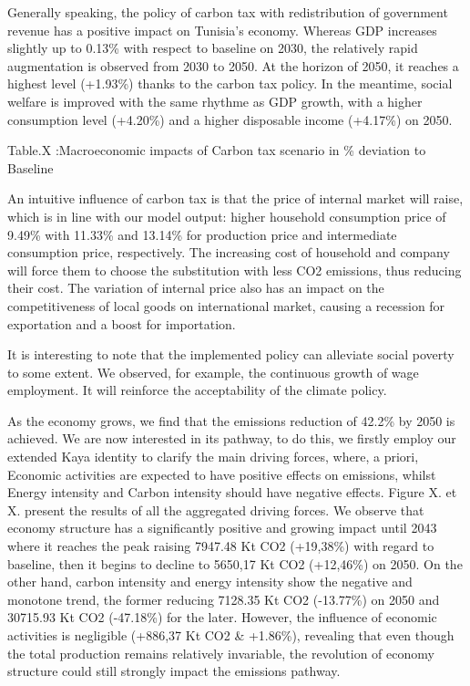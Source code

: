 \documentclass[
]{article}
\begin{document}
Generally speaking, the policy of carbon tax with redistribution of
government revenue has a positive impact on Tunisia's economy. Whereas
GDP increases slightly up to 0.13\% with respect to baseline on 2030,
the relatively rapid augmentation is observed from 2030 to 2050. At the
horizon of 2050, it reaches a highest level (+1.93\%) thanks to the
carbon tax policy. In the meantime, social welfare is improved with the
same rhythme as GDP growth, with a higher consumption level (+4.20\%)
and a higher disposable income (+4.17\%) on 2050.

Table.X :Macroeconomic impacts of Carbon tax scenario in \% deviation to
Baseline

An intuitive influence of carbon tax is that the price of internal
market will raise, which is in line with our model output: higher
household consumption price of 9.49\% with 11.33\% and 13.14\% for
production price and intermediate consumption price, respectively. The
increasing cost of household and company will force them to choose the
substitution with less CO2 emissions, thus reducing their cost. The
variation of internal price also has an impact on the competitiveness of
local goods on international market, causing a recession for exportation
and a boost for importation.

It is interesting to note that the implemented policy can alleviate
social poverty to some extent. We observed, for example, the continuous
growth of wage employment. It will reinforce the acceptability of the
climate policy.

As the economy grows, we find that the emissions reduction of 42.2\% by
2050 is achieved. We are now interested in its pathway, to do this, we
firstly employ our extended Kaya identity to clarify the main driving
forces, where, a priori, Economic activities are expected to have
positive effects on emissions, whilst Energy intensity and Carbon
intensity should have negative effects. Figure X. et X. present the
results of all the aggregated driving forces. We observe that economy
structure has a significantly positive and growing impact until 2043
where it reaches the peak raising 7947.48 Kt CO2 (+19,38\%) with regard
to baseline, then it begins to decline to 5650,17 Kt CO2 (+12,46\%) on
2050. On the other hand, carbon intensity and energy intensity show the
negative and monotone trend, the former reducing 7128.35 Kt CO2
(-13.77\%) on 2050 and 30715.93 Kt CO2 (-47.18\%) for the later.
However, the influence of economic activities is negligible (+886,37 Kt
CO2 \& +1.86\%), revealing that even though the total production remains
relatively invariable, the revolution of economy structure could still
strongly impact the emissions pathway.
\end{document}
